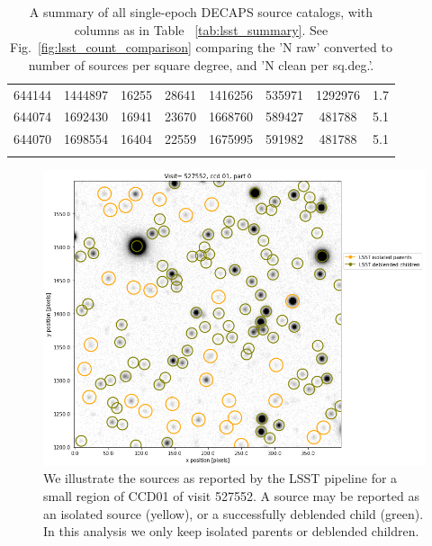 \documentclass[DM,lsstdraft,toc,usenatbib]{lsstdoc}
\begin{document}
\begin{longtable}{cccccccc}
644144 & 1444897 & 16255 & 28641 & 1416256 & 535971 & 1292976 & 1.7 \\
644074 & 1692430 & 16941 & 23670 & 1668760 & 589427 & 481788 & 5.1 \\
644070 & 1698554 & 16404 & 22559 & 1675995 & 591982 & 481788 & 5.1 \\
\hline
\caption{A summary of all single-epoch DECAPS source catalogs, with columns as in  Table ~\ref{tab:lsst_summary}. See Fig.~\ref{fig:lsst_count_comparison} comparing the 'N raw' converted to number of sources per square degree, and  'N clean per sq.deg.'.  }
\label{tab:decaps_summary}
\end{longtable}


\begin{figure}
\begin{centering}
\includegraphics[width=1.0\columnwidth]{figs/visit_527552_ccd_1.png}
\caption{We illustrate the sources as reported by the LSST pipeline for a small region of CCD01 of visit 527552. A source may be reported as an isolated source (yellow),  or a successfully deblended child (green). In this analysis we only keep isolated parents or deblended children.}
\label{fig:lsst_sources}
\end{centering}
\end{figure} 
\end{document}
